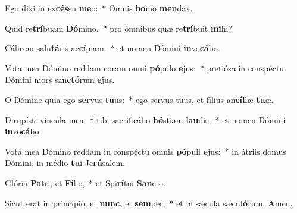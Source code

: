 \item Ego dixi in ex\textbf{cés}su \textbf{me}o:~* Omnis \textbf{ho}mo \textbf{men}dax.
\item Quid re\textbf{trí}buam \textbf{Dó}mino,~* pro ómnibus quæ re\textbf{trí}buit \textbf{mi}hi?
\item Cálicem salu\textbf{tá}ris ac\textbf{cí}piam:~* et nomen Dómini \textbf{in}vo\textbf{cá}bo.
\item Vota mea Dómino reddam coram omni \textbf{pó}pulo \textbf{e}jus:~* pretiósa in conspéctu Dómini mors san\textbf{ctó}rum \textbf{e}jus.
\item O Dómine quia ego \textbf{ser}vus \textbf{tu}us:~* ego servus tuus, et fílius an\textbf{cíl}læ \textbf{tu}æ.
\item Dirupísti víncula mea:~† tibi sacrificábo \textbf{hó}stiam \textbf{lau}dis,~* et nomen Dómini \textbf{in}vo\textbf{cá}bo.
\item Vota mea Dómino reddam in conspéctu omnis \textbf{pó}puli \textbf{e}jus:~* in átriis domus Dómini, in médio \textbf{tu}i Je\textbf{rú}salem.
\item Glória \textbf{Pa}tri, et \textbf{Fí}lio,~* et Spi\textbf{rí}tui \textbf{San}cto.
\item Sicut erat in princípio, et \textbf{nunc,} et \textbf{sem}per,~* et in sǽcula sæcu\textbf{ló}rum. \textbf{A}men.
